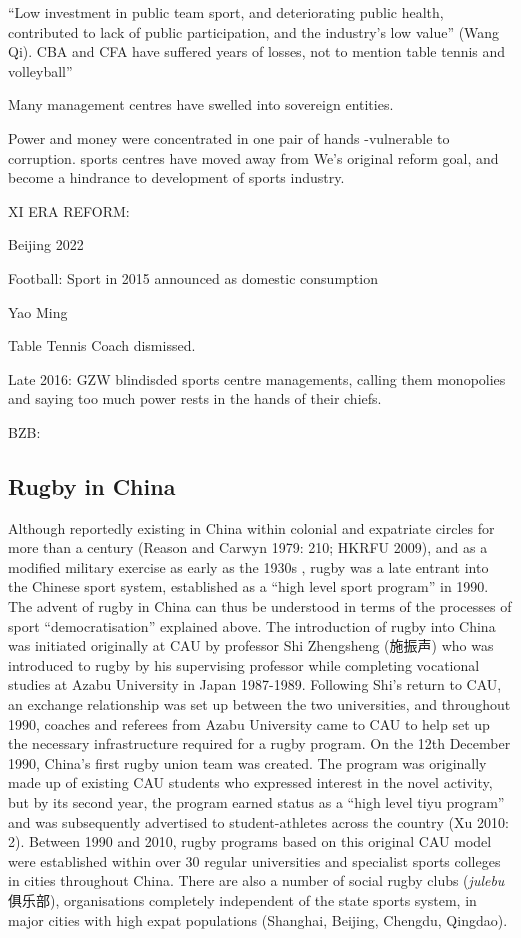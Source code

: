     ``Low investment in public team sport, and deteriorating public health, contributed to lack of public participation, and the industry’s low value'' (Wang Qi). CBA and CFA have suffered years of losses, not to mention table tennis and volleyball”

    Many management centres have swelled into sovereign entities.

    Power and money were concentrated in one pair of hands -vulnerable to corruption.  sports centres have moved away from We’s original reform goal, and become a hindrance to development of sports industry.


    XI ERA REFORM:

    Beijing 2022

    Football:
    Sport in 2015 announced as domestic consumption

    Yao Ming

    Table Tennis Coach dismissed.

    Late 2016:  GZW blindisded sports centre managements, calling them monopolies and saying too much power rests in the hands of their chiefs.


    BZB:












    \subsection{Rugby in China}
    Although reportedly existing in China within colonial and expatriate circles for more than a century (Reason and Carwyn 1979: 210; HKRFU 2009), and as a modified military exercise as early as the 1930s \citep[135]{Morris2004}, rugby was a late entrant into the Chinese sport system, established as a ``high level sport program'' in 1990.  The advent of rugby in China can thus be understood in terms of the processes of sport ``democratisation'' explained above.  The introduction of rugby into China was initiated originally at CAU by professor Shi Zhengsheng (施振声) who was introduced to rugby by his supervising professor while completing vocational studies at Azabu University in Japan 1987-1989.  Following Shi’s return to CAU, an exchange relationship was set up between the two universities, and throughout 1990, coaches and referees from Azabu University came to CAU to help set up the necessary infrastructure required for a rugby program.  On the 12th December 1990, China’s first rugby union team was created.  The program was originally made up of existing CAU students who expressed interest in the novel activity, but by its second year, the program earned status as a “high level tiyu program” and was subsequently advertised to student-athletes across the country (Xu 2010: 2).  Between 1990 and 2010, rugby programs based on this original CAU model were established within over 30 regular universities and specialist sports colleges in cities throughout China.  There are also a number of social rugby clubs (\textit{julebu} 俱乐部), organisations completely independent of the state sports system, in major cities with high expat populations (Shanghai, Beijing, Chengdu, Qingdao).

